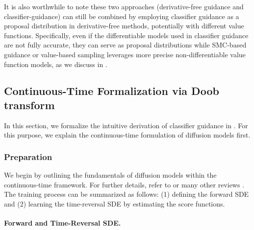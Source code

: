 It is also worthwhile to note these two approaches (derivative-free guidance and classifier-guidance) can still be combined by employing classifier guidance as a proposal distribution in derivative-free methods, potentially with different value functions. Specifically, even if the differentiable models used in classifier guidance are not fully accurate, they can serve as proposal distributions while SMC-based guidance or value-based sampling leverages more precise non-differentiable value function models, as we discuss in . 



\subsection{Continuous-Time Formalization via Doob transform}\label{sec:formalization_conti}

In this section, we formalize the intuitive derivation of classifier guidance in . For this purpose, we explain the continuous-time formulation of diffusion models first. 


\subsubsection{Preparation}

We begin by outlining the fundamentals of diffusion models within the continuous-time framework. For further details, refer to \citet[Section 1.1.1]{uehara2024understanding} or many other reviews \citep{tang2024score}. The training process can be summarized as follows: (1) defining the forward SDE and (2) learning the time-reversal SDE by estimating the score functions.


\paragraph{Forward and Time-Reversal SDE.}

